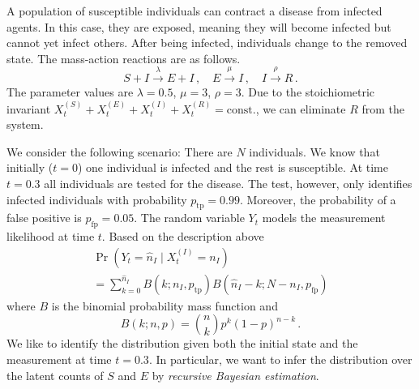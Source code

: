 \begin{model}\label{model:seir}
A population of susceptible individuals can contract a disease from infected agents. In this case, they are exposed, meaning they will become infected but cannot yet infect others. After being infected, individuals change to the removed state. The mass-action reactions are as follows.
    \[ S + I \xrightarrow{\lambda} E + I\,, \quad
E \xrightarrow{\mu} I\,, \quad
    I \xrightarrow{\rho} R\,. \]
The parameter values are $\lambda=0.5$, $\mu=3$, $\rho=3$. Due to the stoichiometric invariant $X_t^{(S)} + X_t^{(E)} + X_t^{(I)} + X_t^{(R)} = \mathrm{const.}$, we can eliminate $R$ from the system.
\end{model}

We consider the following scenario:
There are $N$ individuals.
We know that initially ($t=0$) one individual is infected and the rest is susceptible.
At time $t=0.3$ all individuals are tested for the disease.
The test, however, only identifies infected individuals with probability
$p_{\text{tp}}= 0.99$.
Moreover, the probability of a false positive is $p_{\text{fp}} = 0.05$.
The random variable $Y_t$ models the measurement likelihood at time $t$.
Based on the description above
\begin{multline*}
	\Pr(Y_t=\hat{n}_I\mid X_t^{(I)} = n_I)\\
	=
	\sum_{k=0}^{\hat{n}_I} B(k; {n_I}, p_{\text{tp}}) B(\hat{n}_I - k ; N - n_I, p_{\text{fp}})
\end{multline*}
where $B$ is the binomial probability mass function and
\[
	B(k; n, p) = \binom{n}{k}p^k(1 - p)^{n -  k}\,.
\]
We like to identify the distribution given both the initial state and the measurement at time $t=0.3$.
In particular, we want to infer the distribution over the latent counts of  $S$ and $E$ by
  \emph{recursive Bayesian estimation}.

